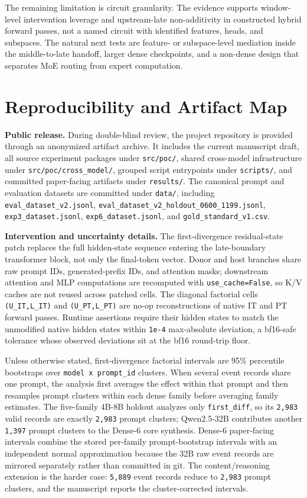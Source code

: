 \documentclass[11pt]{article}
\begin{document}
The remaining limitation is circuit granularity. The evidence supports window-level intervention leverage and upstream-late non-additivity in constructed hybrid forward passes, not a named circuit with identified features, heads, and subspaces. The natural next tests are feature- or subspace-level mediation inside the middle-to-late handoff, larger dense checkpoints, and a non-dense design that separates MoE routing from expert computation.

\section{Reproducibility and Artifact Map}

\textbf{Public release.} During double-blind review, the project repository is provided through an anonymized artifact archive. It includes the current manuscript draft, all source experiment packages under \texttt{src/poc/}, shared cross-model infrastructure under \texttt{src/poc/cross\_model/}, grouped script entrypoints under \texttt{scripts/}, and committed paper-facing artifacts under \texttt{results/}. The canonical prompt and evaluation datasets are committed under \texttt{data/}, including \texttt{eval\_dataset\_v2.jsonl}, \texttt{eval\_dataset\_v2\_holdout\_0600\_1199.jsonl}, \texttt{exp3\_dataset.jsonl}, \texttt{exp6\_dataset.jsonl}, and \texttt{gold\_standard\_v1.csv}.

\textbf{Intervention and uncertainty details.} The first-divergence residual-state patch replaces the full hidden-state sequence entering the late-boundary transformer block, not only the final-token vector. Donor and host branches share raw prompt IDs, generated-prefix IDs, and attention masks; downstream attention and MLP computations are recomputed with \texttt{use\_cache=False}, so K/V caches are not reused across patched cells. The diagonal factorial cells \texttt{(U\_IT,L\_IT)} and \texttt{(U\_PT,L\_PT)} are no-op reconstructions of native IT and PT forward passes. Runtime assertions require their hidden states to match the unmodified native hidden states within \texttt{1e-4} max-absolute deviation, a bf16-safe tolerance whose observed deviations sit at the bf16 round-trip floor.

Unless otherwise stated, first-divergence factorial intervals are 95\% percentile bootstraps over \texttt{model x prompt\_id} clusters. When several event records share one prompt, the analysis first averages the effect within that prompt and then resamples prompt clusters within each dense family before averaging family estimates. The five-family 4B-8B holdout analyzes only \texttt{first\_diff}, so its \texttt{2,983} valid records are exactly \texttt{2,983} prompt clusters; Qwen2.5-32B contributes another \texttt{1,397} prompt clusters to the Dense-6 core synthesis. Dense-6 paper-facing intervals combine the stored per-family prompt-bootstrap intervals with an independent normal approximation because the 32B raw event records are mirrored separately rather than committed in git. The content/reasoning extension is the harder case: \texttt{5,889} event records reduce to \texttt{2,983} prompt clusters, and the manuscript reports the cluster-corrected intervals.
\end{document}
